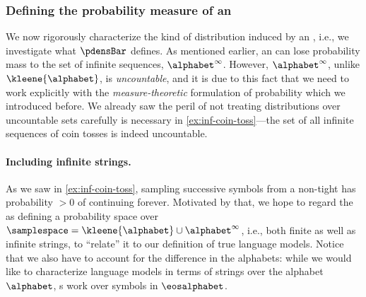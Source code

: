 \subsubsection{Defining the probability measure of an \autoregmodelAcronym}
We now rigorously characterize the kind of distribution induced by an \autoregmodelAcronym, i.e., we investigate what $\pdensBar$ defines. 
As mentioned earlier, an \autoregmodelAcronym can lose probability mass to the set of infinite sequences, $\alphabet^\infty$. 
However, $\alphabet^\infty$, unlike $\kleene{\alphabet}$, is \emph{uncountable}, and it is due to this fact that we need to work explicitly with the \emph{measure-theoretic} formulation of probability which we introduced before.
We already saw the peril of not treating distributions over uncountable sets carefully is necessary in \cref{ex:inf-coin-toss}---the set of all infinite sequences of coin tosses is indeed uncountable.

\paragraph{Including infinite strings.}
As we saw in \cref{ex:inf-coin-toss}, sampling successive symbols from a non-tight \autoregmodelAcronym has probability $> 0$ of continuing forever. 
Motivated by that, we hope to regard the \autoregmodelAcronym as defining a probability space over $\samplespace = \kleene{\alphabet} \cup \alphabet^\infty$, i.e., both finite as well as infinite strings, to ``relate'' it to our definition of true language models.
Notice that we also have to account for the difference in the alphabets: while we would like to characterize language models in terms of strings over the alphabet $\alphabet$, \autoregmodelAcronym{}s work over symbols in $\eosalphabet$.

